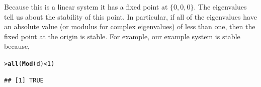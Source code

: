 \documentclass[11pt]{article}\usepackage[]{graphicx}\usepackage[]{color}
\makeatletter
\newcommand{\hlnum}[1]{\textcolor[rgb]{0.686,0.059,0.569}{#1}}%
\newcommand{\hlopt}[1]{\textcolor[rgb]{0,0,0}{#1}}%
\newcommand{\hlstd}[1]{\textcolor[rgb]{0.345,0.345,0.345}{#1}}%
\newcommand{\hlkwd}[1]{\textcolor[rgb]{0.737,0.353,0.396}{\textbf{#1}}}%
\newenvironment{kframe}{%
 \def\at@end@of@kframe{}%
 \ifinner\ifhmode%
  \def\at@end@of@kframe{\end{minipage}}%
  \begin{minipage}{\columnwidth}%
 \fi\fi%
 \def\FrameCommand##1{\hskip\@totalleftmargin \hskip-\fboxsep
 \colorbox{shadecolor}{##1}\hskip-\fboxsep
     \hskip-\linewidth \hskip-\@totalleftmargin \hskip\columnwidth}%
 \MakeFramed {\advance\hsize-\width
   \@totalleftmargin\z@ \linewidth\hsize
   \@setminipage}}%
 {\par\unskip\endMakeFramed%
 \at@end@of@kframe}
\newenvironment{knitrout}{}{} %
\numberwithin{exercise}{section}
\makeatother
\begin{document}
Because this is a linear system it has a fixed point at
$\{0,0,0\}$. The eigenvalues tell us about the stability of this
point. In particular, if all of the eigenvalues have an absolute value
(or modulus for complex eigenvalues) of less than one, then the fixed
point at the origin is stable. For example, our example system is
stable because,
\begin{knitrout}
\color{fgcolor}\begin{kframe}
\begin{alltt}
\hlstd{> }\hlkwd{all}\hlstd{(}\hlkwd{Mod}\hlstd{(d)} \hlopt{<} \hlnum{1}\hlstd{)}
\end{alltt}
\begin{verbatim}
## [1] TRUE
\end{verbatim}
\end{kframe}
\end{knitrout}
\end{document}
